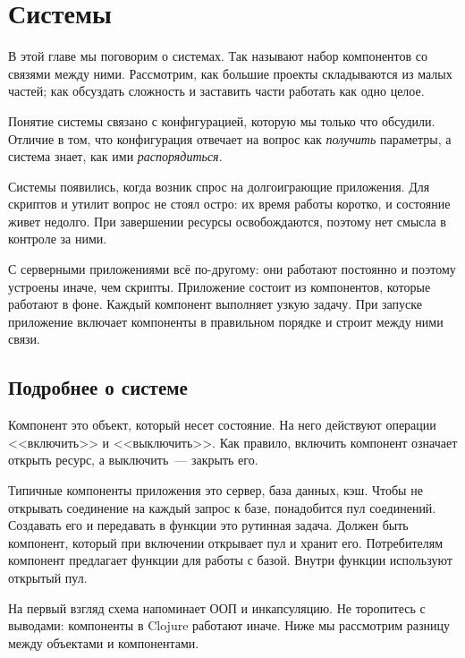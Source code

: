 \chapter{Системы}

\label{chapter-systems}

\begin{teaser}
В этой главе мы поговорим о системах. Так называют набор компонентов со связями
между ними. Рассмотрим, как большие проекты складываются из малых частей; как
обсуздать сложность и заставить части работать как одно целое.
\end{teaser}

Понятие системы связано с конфигурацией, которую мы только что обсудили. Отличие
в том, что конфигурация отвечает на вопрос как \emph{получить} параметры, а
система знает, как ими \emph{распорядиться}.

Системы появились, когда возник спрос на долгоиграющие приложения. Для скриптов
и утилит вопрос не стоял остро: их время работы коротко, и состояние живет
недолго. При завершении ресурсы освобождаются, поэтому нет смысла в контроле за
ними.

С серверными приложениями вс\"{е} по-другому: они работают постоянно и поэтому
устроены иначе, чем скрипты. Приложение состоит из компонентов, которые работают
в фоне. Каждый компонент выполняет узкую задачу. При запуске приложение включает
компоненты в правильном порядке и строит между ними связи.

\section{Подробнее о системе}

Компонент это объект, который несет состояние. На него действуют операции
<<включить>> и <<выключить>>. Как правило, включить компонент означает открыть
ресурс, а выключить~--- закрыть его.

Типичные компоненты приложения это сервер, база данных, кэш. Чтобы не открывать
соединение на каждый запрос к базе, понадобится пул соединений. Создавать его и
передавать в функции это рутинная задача. Должен быть компонент, который при
включении открывает пул и хранит его. Потребителям компонент предлагает функции
для работы с базой. Внутри функции используют открытый пул.

На первый взгляд схема напоминает ООП и инкапсуляцию. Не торопитесь с выводами:
компоненты в Clojure работают иначе. Ниже мы рассмотрим разницу между объектами
и компонентами.

